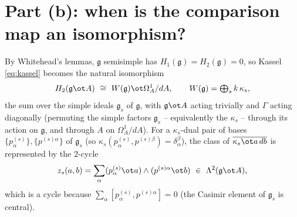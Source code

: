 \documentclass{amsart}
\theoremstyle{definition}
\newcommand{\g}{\mathfrak{g}}
\newcommand{\Om}{\Omega}
\newcommand{\Gm}{\Gamma}
\begin{document}
\section{Part (b): when is the comparison map an isomorphism?}

By Whitehead's lemmas, $\g$ semisimple has $H_1(\g)=H_2(\g)=0$, so Kassel
\eqref{eq:kassel} becomes the natural isomorphism
\begin{equation}\label{eq:ss-kassel}
   H_2(\g\ot A)\ \cong\ W(\g)\ot\Om^1_A/dA ,\qquad
   W(\g)=\textstyle\bigoplus_{s}k\,\kappa_s ,
\end{equation}
the sum over the simple ideals $\g_s$ of $\g$, with $\g\ot A$ acting trivially and
$\Gm$ acting diagonally (permuting the simple factors $\g_s$ -- equivalently the
$\kappa_s$ -- through its action on $\g$, and through $A$ on $\Om^1_A/dA$).  For
a $\kappa_s$-dual pair of bases $\{p^{(s)}_\alpha\},\{p^{(s)\alpha}\}$ of $\g_s$
(so $\kappa_s(p^{(s)}_\alpha,p^{(s)\beta})=\delta_\alpha^\beta$), the class of
$\overline{\kappa_s\ot a\,db}$ is represented by the $2$-cycle
\begin{equation}\label{eq:cas-cycle}
   z_s(a,b)=\sum_\alpha (p^{(s)}_\alpha\ot a)\wedge(p^{(s)\alpha}\ot b)
   \ \in\ \Lambda^2(\g\ot A),
\end{equation}
which is a cycle because $\sum_\alpha[p^{(s)}_\alpha,p^{(s)\alpha}]=0$ (the
Casimir element of $\g_s$ is central).
\end{document}

